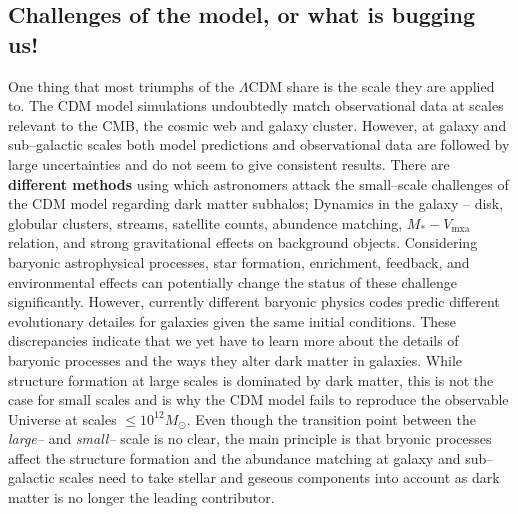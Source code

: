 \documentclass[paper=a4, fontsize=11pt]{scrartcl} %
\numberwithin{equation}{section} %
\numberwithin{figure}{section} %
\numberwithin{table}{section} %
\begin{document}
\subsection{Challenges of the model, or what is bugging us!}
\label{subsec:LCDM_challenges}
One thing that most triumphs of the $\Lambda$CDM share is the scale they are applied to. The CDM model simulations undoubtedly match observational data at scales relevant to the CMB, the cosmic web and galaxy cluster. However, at galaxy and sub--galactic scales both model predictions and observational data are followed by large uncertainties and do not seem to give consistent results. There are {\bf different methods} using which astronomers attack the small--scale challenges of the CDM model regarding dark matter subhalos; Dynamics in the galaxy -- disk, globular clusters, streams, satellite counts, abundence matching, $M_* - V_\mathrm{mxa}$ relation, and strong gravitational effects on background objects. Considering baryonic astrophysical processes, star formation, enrichment, feedback, and environmental effects can potentially change the status of these challenge significantly. However, currently different baryonic physics codes predic different evolutionary detailes for galaxies given the same initial conditions. These discrepancies indicate that we yet have to learn more about the details of baryonic processes and the ways they alter dark matter in galaxies. While structure formation at large scales is dominated by dark matter, this is not the case for small scales and is why the CDM model fails to reproduce the observable Universe at scales $\leq 10^{12} M_\odot$. Even though the transition point between the \emph{large--} and \emph{small--} scale is no clear, the main principle is that bryonic processes affect the structure formation and the abundance matching at galaxy and sub--galactic scales need to take stellar and geseous components into account as dark matter is no longer the leading contributor.
\end{document}
